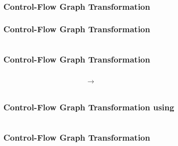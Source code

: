 \begin{frame}[t]
	\frametitle{Control-Flow Graph Transformation}
	\resizebox{\textwidth}{!}{}
\end{frame}

\begin{frame}[t]
	\frametitle{Control-Flow Graph Transformation}
	\begin{columns}
		\begin{column}{0.4\textwidth}
			\resizebox{0.75\textwidth}{!}{}
		\end{column}
		\begin{column}{0.4\textwidth}
			\onslide<3->
			\resizebox{0.6\textwidth}{!}{}
		\end{column}
	\end{columns}
\end{frame}

\begin{frame}[t]
	\frametitle{Control-Flow Graph Transformation}
	\begin{center}
		\begin{columns}[c]
			\begin{column}{0.4\textwidth}
				\resizebox{0.6\textwidth}{!}{}
			\end{column}
			\begin{column}{0.03\textwidth}
				$\rightarrow$
			\end{column}
			\begin{column}{0.4\textwidth}
					\resizebox{\textwidth}{!}{}
			\end{column}
		\end{columns}
		\end{center}
\end{frame}

\begin{frame}[t]
	\frametitle{Control-Flow Graph Transformation using \qvasr}
	\begin{columns}
		\begin{column}{0.4\textwidth}
			\resizebox{0.75\textwidth}{!}{}
		\end{column}
			\begin{column}{0.4\textwidth}
				\resizebox{\textwidth}{!}{}
			\end{column}
	\end{columns}
\end{frame}

\begin{frame}[t]
	\frametitle{Control-Flow Graph Transformation}
	\begin{columns}
		\begin{column}{0.4\textwidth}
			\resizebox{0.75\textwidth}{!}{}
		\end{column}
		\begin{column}{0.4\textwidth}
			\resizebox{0.8\textwidth}{!}{}
		\end{column}
	\end{columns}
\end{frame}